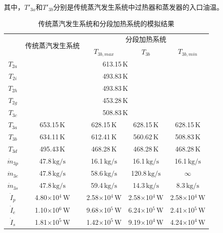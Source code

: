 其中，$T'_{3a}$和$T'_{3b}$分别是传统蒸汽发生系统中过热器和蒸发器的入口油温。
\begin{table}[htbp]
\setlength{\abovecaptionskip}{-10pt}
	\caption{传统蒸汽发生系统和分段加热系统的模拟结果}
	\begin{center}
	\begin{tabular}{ccccc}
		\toprule
		& \multirow{2}{*}{传统蒸汽发生系统} & \multicolumn{3}{c}{分段加热系统}\\\cline{3-5}
 &  & $T_{3b,max}$ & $T_{3b}$ & $T_{3b,min}$\\
		\midrule
		$T_{2a}$ & \multicolumn{4}{c}{613.15$\,\mathrm{K}$}\\
		$T_{2i}$ & \multicolumn{4}{c}{493.83$\,\mathrm{K}$}\\
		$T_{2h}$ & \multicolumn{4}{c}{493.83$\,\mathrm{K}$}\\
		$T_{2g}$ & \multicolumn{4}{c}{453.28$\,\mathrm{K}$}\\
		$T_{3c}$ & \multicolumn{4}{c}{508.83$\,\mathrm{K}$}\\
		$T_{3a}$	&	653.15$\,\mathrm{K}$
	&	628.15$\,\mathrm{K}$	&	628.15$\,\mathrm{K}$	&	628.15$\,\mathrm{K}$\\
		$T_{3b}$	&	634.11$\,\mathrm{K}$	&	612.41$\,\mathrm{K}$	&	560.62$\,\mathrm{K}$	&	508.83$\,\mathrm{K}$\\
		$T_{3d}$	&	495.43$\,\mathrm{K}$
	&	468.28$\,\mathrm{K}$	&	468.28$\,\mathrm{K}$	&	468.28$\,\mathrm{K}$\\
		$\dot{m}_{3p}$	&	47.8$\,\mathrm{kg/s}$	&	16.1$\,\mathrm{kg/s}$	&	16.1$\,\mathrm{kg/s}$	&	16.1$\,\mathrm{kg/s}$\\
		$\dot{m}_{3e}$	&	47.8$\,\mathrm{kg/s}$	&	58.6$\,\mathrm{kg/s}$	&	120.8$\,\mathrm{kg/s}$	&	$\infty$\\
		$\dot{m}_{3s}$	&	47.8$\,\mathrm{kg/s}$	&	59.4$\,\mathrm{kg/s}$	&	14.3$\,\mathrm{kg/s}$	&	8.3$\,\mathrm{kg/s}$\\
		$\dot{I}_p$    &    4.80$\times$10$^4\,\mathrm{W}$    	&  2.58$\times$10$^4\,\mathrm{W}$  &	2.58$\times$10$^4\,\mathrm{W}$	&	2.58$\times$10$^4\,\mathrm{W}$\\
		$\dot{I}_e$    &    1.10$\times$10$^6\,\mathrm{W}$    	&  9.68$\times$10$^5\,\mathrm{W}$  &	6.24$\times$10$^5\,\mathrm{W}$	&	2.41$\times$10$^5\,\mathrm{W}$	\\
		$\dot{I}_s$    &    1.81$\times$10$^5\,\mathrm{W}$    	&  1.42$\times$10$^5\,\mathrm{W}$  &	9.19$\times$10$^4\,\mathrm{W}$	&	4.24$\times$10$^4\,\mathrm{W}$\\

\end{tabular}
\end{center}
\end{table}
